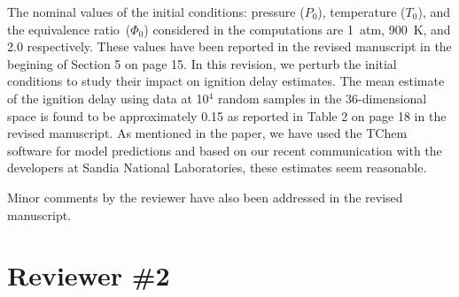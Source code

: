 \documentclass[11pt,final]{article}
\begin{document}
\begin{enumerate}[wide, labelwidth=!, labelindent=0pt]
\noindent  The nominal values of the initial conditions: pressure ($P_0$), temperature ($T_0$), and
the equivalence ratio~($\Phi_0$) considered in the computations are 1~atm, 900~K, and 2.0
respectively. These values have been reported in the revised manuscript in the begining of
Section 5 on page 15.
In this revision, we perturb the initial conditions to study their impact
on ignition delay estimates. The mean estimate of the ignition delay using data at 10$^4$ random samples in
the 36-dimensional space is found to be approximately 0.15 as reported in Table 2 on page 18 in the
revised manuscript. As mentioned in the paper, we have used 
the TChem software for model predictions and based on our recent communication with the developers at
Sandia National Laboratories, these estimates seem reasonable. 

\noindent Minor comments by the reviewer have also been addressed in the revised manuscript.

\end{enumerate}

\section*{Reviewer \#2}
\end{document}
